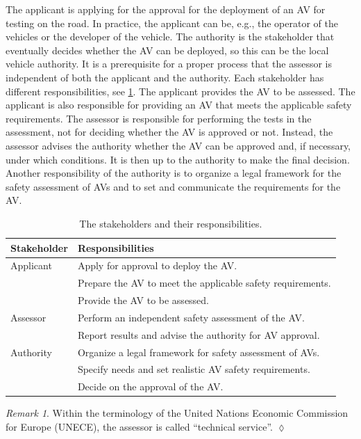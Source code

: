 \documentclass[twoside,twocolumn,9pt]{article}
\theoremstyle{plain}
\theoremstyle{remark}\newtheorem{remarkenv}{Remark}        %
\newenvironment{remark}{\begin{remarkenv}}%
	{\hfill$\lozenge$\end{remarkenv}}            %
\newcommand{\otoprule}{\midrule[\heavyrulewidth]}
\begin{document}
The applicant is applying for the approval for the deployment of an AV for testing on the road. In practice, the applicant can be, e.g., the operator of the vehicles or the developer of the vehicle. The authority is the stakeholder that eventually decides whether the AV can be deployed, so this can be the local vehicle authority. It is a prerequisite for a proper process that the assessor is independent of both the applicant and the authority.
Each stakeholder has different responsibilities, see \cref{tab:stakeholders}. The applicant provides the AV to be assessed. The applicant is also responsible for providing an AV that meets the applicable safety requirements. The assessor is responsible for performing the tests in the assessment, not for deciding whether the AV is approved or not. Instead, the assessor advises the authority whether the AV can be approved and, if necessary, under which conditions. It is then up to the authority to make the final decision. Another responsibility of the authority is to organize a legal framework for the safety assessment of AVs and to set and communicate the requirements for the AV.

\begin{table}
	\centering
	\caption{The stakeholders and their responsibilities.}
	\label{tab:stakeholders}
	\begin{tabularx}{\linewidth}{lX}
		\toprule
		Stakeholder & Responsibilities \\ \otoprule
		Applicant & Apply for approval to deploy the AV. \\
		& Prepare the AV to meet the applicable safety requirements. \\
		& Provide the AV to be assessed. \\ \otoprule
		Assessor & Perform an independent safety assessment of the AV. \\
		& Report results and advise the authority for AV approval. \\ \otoprule
		Authority & Organize a legal framework for safety assessment of AVs. \\
		& Specify needs and set realistic AV safety requirements. \\
		& Decide on the approval of the AV. \\
		\bottomrule
	\end{tabularx}
\end{table}

\begin{remark}
	Within the terminology of the United Nations Economic Commission for Europe (UNECE), the assessor is called ``technical service''.
\end{remark}
\end{document}
